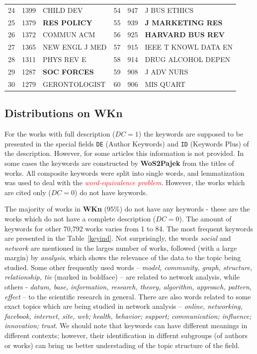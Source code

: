 \documentclass[11pt]{article} %
\newcommand{\keyw}[1]{\textcolor{red}{\emph{#1}}}
\newcommand{\Remark}[1]{\ifodd\value{page} \normalmarginpar
 \else \reversemarginpar \fi \marginpar{{\footnotesize #1}} }
\begin{document}
\begin{table}
\begin{tabular}{c|r|l||c|r|l}
24&	1399&	CHILD DEV&	54&	947&	J BUS ETHICS\\
25&	1379&	\textbf{RES POLICY}&	55&	939&	\textbf{J MARKETING RES}\\
26&	1372&	COMMUN ACM&	56&	925&	\textbf{HARVARD BUS REV}\\
27&	1365&	NEW ENGL J MED&	57&	915&	IEEE T KNOWL DATA EN\\
28&	1311&	PHYS REV E&	58&	914&	DRUG ALCOHOL DEPEN\\
29&	1287&	\textbf{SOC FORCES}&	59&	908&	J ADV NURS\\
30&	1279&	GERONTOLOGIST&	60&	906&	MIS QUART\\ \hline
\end{tabular}
\end{table}

\subsection{Distributions on WKn}

For the works with full description ($DC=1$) the keywords are supposed to be presented in the special fields \texttt {DE} (Author Keywords) and \texttt {ID} (Keywords Plus) of the description. However, for some articles this information is not provided. In some cases the keywords are constructed by \textbf{WoS2Pajek} from the titles of works. All composite keywords were split into single words, and lemmatization was used to deal with the \keyw{word-equivalence problem}. However, the works which are cited only ($DC=0$) do not have keywords. \medskip

The majority of works in \textbf{WKn} (95\%) do not have any keywords - these are the works which do not have a complete description ($DC=0$). The amount of keywords for other 70,792 works varies from 1 to 84. \Remark{ Idea: loolk at moda, or average?} The most frequent keywords are presented in the Table~\ref{keyind}. Not surprisingly, the words \textit{social} and \textit{network} are mentioned in the larges number of works, followed (with a large margin) by \textit{analysis}, which shows the relevance of the data to the topic being studied. Some other frequently used words -- \textit{model, community, graph, structure, relationship, tie} (marked in boldface) -- are related to network analysis, while others - \textit{datum, base, information, research, theory, algorithm, approach, pattern, effect} -- to the scientific research in general. There are also words related to some exact topics which are being studied in network analysis -- \textit{online,  networking, facebook, internet, site, web; health, behavior; support; communication; influence; innovation; trust}. We should note that keywords can have different meanings in different contexts; however, their identification in differnt subgroups (of authors or works) can bring us better understading of the topic structure of the field. \medskip
\end{document}
